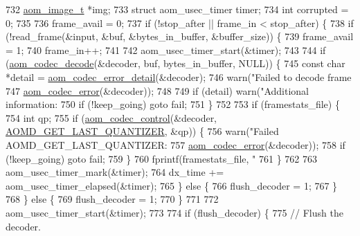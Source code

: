\begin{DoxyCodeInclude}
{{{{{{{{{{{{{{{{{{{{{{{{{{{{{{{{{{{{{{{732     \hyperlink{structaom__image}{aom\_image\_t} *img;
733     \textcolor{keyword}{struct }aom\_usec\_timer timer;
734     \textcolor{keywordtype}{int} corrupted = 0;
735 
736     frame\_avail = 0;
737     \textcolor{keywordflow}{if} (!stop\_after || frame\_in < stop\_after) \{
738       \textcolor{keywordflow}{if} (!read\_frame(&input, &buf, &bytes\_in\_buffer, &buffer\_size)) \{
739         frame\_avail = 1;
740         frame\_in++;
741 
742         aom\_usec\_timer\_start(&timer);
743 
744         \textcolor{keywordflow}{if} (\hyperlink{group__decoder_gab03fdb999d1f83a5896869a3ba5f68f7}{aom\_codec\_decode}(&decoder, buf, bytes\_in\_buffer, NULL)) \{
745           \textcolor{keyword}{const} \textcolor{keywordtype}{char} *detail = \hyperlink{group__codec_ga43a70562598b485685794a4e9d9d53f7}{aom\_codec\_error\_detail}(&decoder);
746           warn(\textcolor{stringliteral}{"Failed to decode frame %
747                \hyperlink{group__codec_ga50949c0854605c722832bbfb0803f5f4}{aom\_codec\_error}(&decoder));
748 
749           \textcolor{keywordflow}{if} (detail) warn(\textcolor{stringliteral}{"Additional information: %
750           \textcolor{keywordflow}{if} (!keep\_going) \textcolor{keywordflow}{goto} fail;
751         \}
752 
753         \textcolor{keywordflow}{if} (framestats\_file) \{
754           \textcolor{keywordtype}{int} qp;
755           \textcolor{keywordflow}{if} (\hyperlink{group__codec_ga6da974f4eeaba1fa74106b28d0fe6ac5}{aom\_codec\_control}(&decoder, 
      \hyperlink{group__aom__decoder_gga3865fd4b3192489baa9a5c3632ebe97baa984acc8b42df9c7d18fc3556a14fd29}{AOMD\_GET\_LAST\_QUANTIZER}, &qp)) \{
756             warn(\textcolor{stringliteral}{"Failed AOMD\_GET\_LAST\_QUANTIZER: %
757                  \hyperlink{group__codec_ga50949c0854605c722832bbfb0803f5f4}{aom\_codec\_error}(&decoder));
758             \textcolor{keywordflow}{if} (!keep\_going) \textcolor{keywordflow}{goto} fail;
759           \}
760           fprintf(framestats\_file, \textcolor{stringliteral}{"%
761         \}
762 
763         aom\_usec\_timer\_mark(&timer);
764         dx\_time += aom\_usec\_timer\_elapsed(&timer);
765       \} \textcolor{keywordflow}{else} \{
766         flush\_decoder = 1;
767       \}
768     \} \textcolor{keywordflow}{else} \{
769       flush\_decoder = 1;
770     \}
771 
772     aom\_usec\_timer\_start(&timer);
773 
774     \textcolor{keywordflow}{if} (flush\_decoder) \{
775       \textcolor{comment}{// Flush the decoder.}
}}}}}}}}}}}}}}}}}}}}}}}}}}}}}}}}}}}}}}}}}}}
\end{DoxyCodeInclude}
